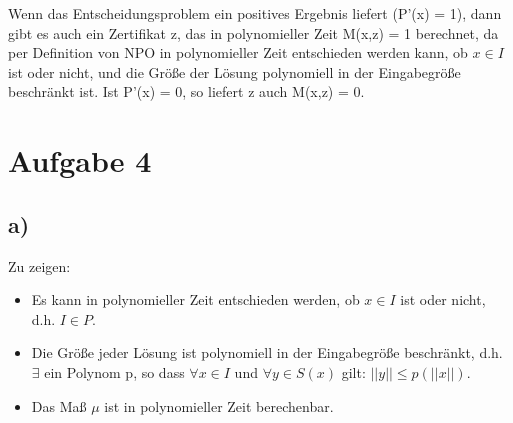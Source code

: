 \documentclass[a4paper,10pt,oneside,leqno]{scrartcl}
\begin{document}
Wenn das Entscheidungsproblem ein positives Ergebnis liefert (P'(x) = 1), dann gibt es auch ein Zertifikat z, das in polynomieller Zeit M(x,z) = 1
berechnet, da per Definition von NPO in polynomieller Zeit entschieden werden kann, ob $x \in I$ ist oder nicht, und die Größe der Lösung
polynomiell in der Eingabegröße beschränkt ist. Ist P'(x) = 0, so liefert z auch M(x,z) = 0.
\section*{Aufgabe 4}%
\subsection*{a)}
Zu zeigen: \begin{itemize}
            \item  Es kann in polynomieller Zeit entschieden werden, ob $x \in I$ ist oder nicht, d.h. $I \in P$.
	    \item Die Größe jeder Lösung ist polynomiell in der Eingabegröße beschränkt, d.h. $\exists$ ein Polynom p, so dass $\forall x \in I$
	    und $\forall y \in S(x)$ gilt: $||y|| \leq p(||x||)$.
	    \item Das Maß $\mu$ ist in polynomieller Zeit berechenbar.
           \end{itemize}

\end{document}
